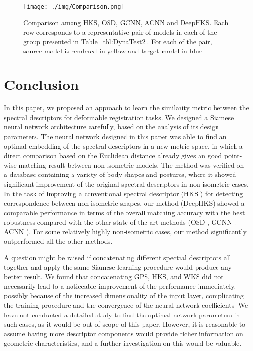 \documentclass[5p,twocolumn,10pt,times]{elsarticle}
\begin{document}
\begin{figure*}
	\begin{center}
			\texttt{[image: ./img/Comparison.png]}
	\end{center}
	\caption{Comparison among HKS, OSD, GCNN, ACNN and DeepHKS. Each row corresponds to a representative pair of models in each of the group presented in Table~\ref{tbl:DynaTest2}. For each of the pair, source model is rendered in yellow and target model in blue.}
	\label{fig:bestmatch3}
\end{figure*}
\section{Conclusion}
\label{sec:5}
In this paper, we proposed an approach to learn the similarity metric between the spectral descriptors for deformable registration tasks. We designed a Siamese neural network architecture carefully, based on the analysis of its design parameters. The neural network designed in this paper was able to find an optimal embedding of the spectral descriptors in a new metric space, in which a direct comparison based on the Euclidean distance already gives an good point-wise matching result between non-isometric models. The method was verified on a database containing a variety of body shapes and postures, where it showed significant improvement of the original spectral descriptors in non-isometric cases. In the task of improving a conventional spectral descriptor (HKS \cite{sun2009concise}) for detecting correspondence between non-isometric shapes, our method (DeepHKS) showed a comparable performance in terms of the overall matching accuracy with the best robustness compared with the other state-of-the-art methods (OSD \cite{litman2014learning}, GCNN \cite{Masci_2015_ICCV_Workshops}, ACNN \cite{boscaini2016learning}). For some relatively  highly non-isometric cases, our method significantly outperformed all the other methods.

A question might be raised if concatenating different spectral descriptors all together and apply the same Siamese learning procedure would produce any better result. We found that concatenating GPS, HKS, and WKS did not necessarily lead to a noticeable improvement of the performance immediately, possibly because of the increased dimensionality of the input layer, complicating the training procedure and the convergence of the neural network coefficients. We have not conducted a detailed study to find the optimal network parameters in such cases, as it would be out of scope of this paper. However, it is reasonable to assume having more descriptor components would provide richer information on geometric characteristics, and a further investigation on this would be valuable.
\end{document}
